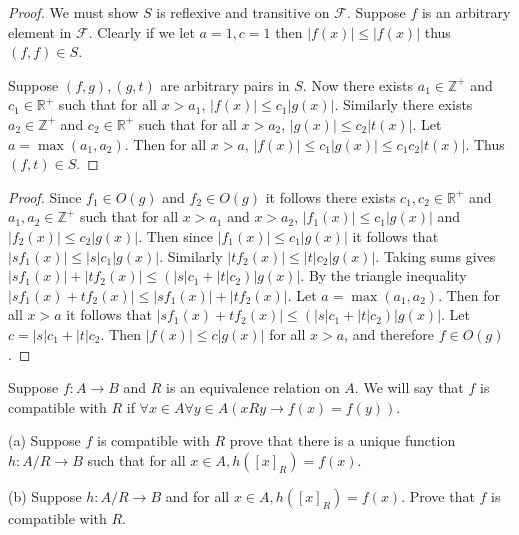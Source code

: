 \begin{proof}
    We must show $S$ is reflexive and transitive on $\mathcal{F}$.
    Suppose $f$ is an arbitrary element in $\mathcal{F}$.
    Clearly if we let $a = 1, c = 1$ then $|f(x)| \le |f(x)|$
        thus $(f, f) \in S$.

    Suppose $(f, g), (g, t)$ are arbitrary pairs in $S$.
    Now there exists $a_1 \in \mathbb{Z}^+$ and $c_1 \in \mathbb{R}^+$
        such that for all $x > a_1$,
        $|f(x)| \le c_1 |g(x)|$.
    Similarly there exists $a_2 \in \mathbb{Z}^+$ and $c_2 \in \mathbb{R}^+$
        such that for all $x > a_2$,
        $|g(x)| \le c_2 |t(x)|$.
    Let $a = \max(a_1, a_2)$. Then for all $x > a$,
        $|f(x)| \le c_1 |g(x)| \le c_1 c_2 |t(x)|$.
    Thus $(f, t) \in S$.
\end{proof}

\begin{proof}
    Since $f_1 \in O(g)$ and $f_2 \in O(g)$ it follows 
        there exists $c_1, c_2 \in \mathbb{R}^+$ and $a_1, a_2 \in \mathbb{Z}^+$
        such that for all $x > a_1$ and $x > a_2$,
        $|f_1(x)| \le c_1 |g(x)|$ and $|f_2(x)| \le c_2 |g(x)|$.
    Then since $|f_1(x)| \le c_1 |g(x)|$ it follows that 
        $|s f_1(x)| \le |s| c_1 |g(x)|$.
    Similarly $|t f_2(x)| \le |t| c_2 |g(x)|$.
    Taking sums gives 
        $|s f_1(x)| + |t f_2(x)| \le (|s| c_1 + |t| c_2)|g(x)|$.
    By the triangle inequality 
        $|s f_1(x) + t f_2(x)| \le |s f_1(x)| + |t f_2(x)|$.
    Let $a = \max(a_1, a_2)$. Then for all $x > a$
        it follows that $|s f_1(x) + t f_2(x)| \le (|s| c_1 + |t| c_2)|g(x)|$.
    Let $c = |s| c_1 + |t| c_2$. Then $|f(x)| \le c |g(x)|$ for all $x > a$,
    and therefore $f \in O(g)$.
\end{proof}

\begin{tcolorbox}[title=Problem 21, breakable]
    Suppose $f : A \rightarrow B$ and $R$ is an equivalence relation on $A$.
    We will say that $f$ is compatible with $R$ if 
    $\forall{x} \in A \forall{y} \in A (xRy \rightarrow f(x) = f(y))$.

    (a) Suppose $f$ is compatible with $R$ prove that there is a unique function 
        $h : A / R \rightarrow B$ such that for all $x \in A, h([x]_R) = f(x)$.

    (b) Suppose $h : A / R \rightarrow B$ and for all $x \in A, h([x]_R) = f(x)$.
        Prove that $f$ is compatible with $R$.
\end{tcolorbox}

